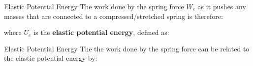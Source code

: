 \documentclass[12pt,compress,aspectratio=169]{beamer}
\begin{document}
\begin{frame}{Elastic Potential Energy}
  \vspace{-.15in}The work done by the spring force $W_e$ as it pushes any
  masses that are connected to a compressed/stretched spring is therefore:


  where $U_e$ is the  \textbf{elastic potential energy}, defined as:
  
\end{frame}



\begin{frame}{Elastic Potential Energy}
  The the work done by the spring force can be related to the elastic
  potential energy by:
  

\end{frame}
\end{document}
